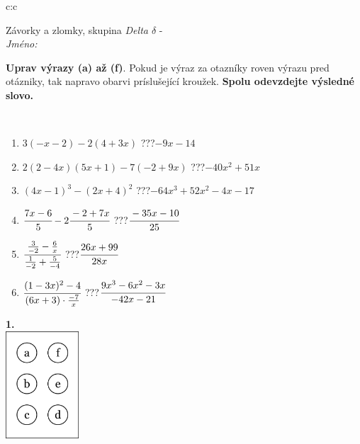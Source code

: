 \documentclass[10pt]{report}
\begin{document}
\begin{tabular}{c:c}
\begin{minipage}[c][104.5mm][t]{0.5\linewidth}
\begin{center}
\vspace{7mm}
{\huge Závorky a zlomky, skupina \textit{Delta $\delta$} -}\\[5mm]
\textit{Jméno:}\phantom{xxxxxxxxxxxxxxxxxxxxxxxxxxxxxxxxxxxxxxxxxxxxxxxxxxxxxxxxxxxxxxxxx}\\[5mm]
\begin{minipage}{0.95\linewidth}
\begin{center}
\textbf{Uprav výrazy (a) až (f)}. Pokud je výraz za otazníky roven výrazu pred otázniky, tak napravo obarvi príslušející kroužek. \textbf{Spolu odevzdejte výsledné slovo.}
\end{center}
\end{minipage}
\\[1mm]
\begin{minipage}{0.79\linewidth}
\begin{center}
\begin{varwidth}{\linewidth}
\begin{enumerate}
\normalsize
\item $3(-x-2)-2(4+3x)$\quad \dotfill\; ???\;\dotfill \quad $-9x-14$
\item $2(2-4x)(5x+1)-7(-2+9x)$\quad \dotfill\; ???\;\dotfill \quad $-40x^2+51x$
\item $(4x-1)^3-(2x+4)^2$\quad \dotfill\; ???\;\dotfill \quad $-64x^3+52x^2-4x-17$
\item $\cfrac{7x-6}{5}-2\cfrac{-2+7x}{5}$\quad \dotfill\; ???\;\dotfill \quad $\cfrac{-35x-10}{25}$
\item $\cfrac{\frac{3}{-2}-\frac{6}{x}}{\frac{1}{-2}+\frac{5}{-4}}$\quad \dotfill\; ???\;\dotfill \quad $\cfrac{26x+99}{28x}$
\item $\cfrac{(1-3x)^2-4}{(6x+3)\cdot\frac{-7}{x}}$\quad \dotfill\; ???\;\dotfill \quad $\cfrac{9x^3-6x^2-3x}{-42x-21}$
\end{enumerate}
\end{varwidth}
\end{center}
\end{minipage}
\begin{minipage}{0.20\linewidth}
\begin{center}
{\Huge\bfseries 1.} \\[2mm]
\includegraphics[height=40mm]{../images/braille.png}

\end{center}
\end{minipage}
\end{center}
\end{minipage}
\end{tabular}
\end{document}
